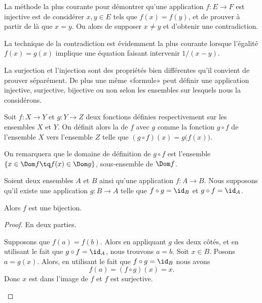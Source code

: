 \begin{normaltext}\label{NORMooMethodePreuveInj}
	La méthode la plus courante pour démontrer qu'une application \( f\colon E\to F\) est injective est de considérer \( x,y\in E\) tels que \( f(x)=f(y)\), et de prouver à partir de là que \( x=y\). Ou alors de supposer \( x\neq y\) et d'obtenir une contradiction.

	La technique de la contradiction est évidemment la plus courante lorsque l'égalité \( f(x)=g(x)\) implique une équation faisant intervenir \( 1/(x-y)\).

	La surjection et l'injection sont des propriétés bien différentes qu'il convient de prouver séparément. De plus une même «formule» peut définir une application injective, surjective, bijective ou non selon les ensembles sur lesquels nous la considérons.
\end{normaltext}

\begin{definition}  \label{DEFcomposeeFonctions}
	Soit \( f: X \to Y \) et \( g: Y \to Z \) deux fonctions définies respectivement sur les ensembles \( X \) et \( Y \). On définit alors la  de \( f \) avec \( g \) comme la fonction \( g \circ f \) de l'ensemble \( X \) vers l'ensemble \( Z \) telle que \( (g \circ f) (x) = g\bigl(f(x)\bigr) \).

	On remarquera que le domaine de définition de \( g \circ f \) est l'ensemble \( \{ x \in \Dom f \tq f(x) \in \Dom g\}\), sous-ensemble de \( \Dom f \).
\end{definition}

\begin{lemma}       \label{LEMooWBYSooFqyqQP}
	Soient deux ensembles \( A\) et \( B\) ainsi qu'une application \( f\colon A\to B\). Nous supposons qu'il existe une application \( g\colon B\to A\) telle que \( f\circ g=\id_B\) et \( g\circ f=\id_A\).

	Alors \( f\) est une bijection.
\end{lemma}

\begin{proof}
	En deux parties.
	\begin{subproof}
		\spitem[Injection]
		Supposons que \( f(a)=f(b)\). Alors en appliquant \( g\) des deux côtés, et en utilisant le fait que \( g\circ f=\id_A\), nous trouvons \( a=b\).
		\spitem[Surjection]
		Soit \( x\in B\). Posons \( a=g(x)\). Alors, en utilisant le fait que \( f\circ g=\id_B\) nous avons
		\begin{equation}
			f(a)=(f\circ g)(x)=x.
		\end{equation}
		Donc \( x\) est dans l'image de \( f\) et \( f\) est surjective.
	\end{subproof}
\end{proof}

